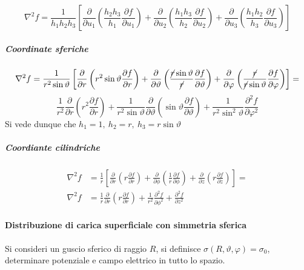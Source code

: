 $$
\nabla^2 f = \frac{1}{h_1h_2h_3} \left[ \frac{\partial}{\partial u_1}
\left(\frac{h_2h_3}{h_1}\frac{\partial f}{\partial u_1}\right) + 
\frac{\partial}{\partial u_2}
\left(\frac{h_1h_3}{h_2}\frac{\partial f}{\partial u_2}\right) + 
\frac{\partial}{\partial u_3}
\left(\frac{h_1h_2}{h_3}\frac{\partial f}{\partial u_3}\right)\right]
$$
\subparagraph{Coordinate sferiche}
$$
\nabla^2 f = \frac{1}{r^2\sin\vartheta} \left[\frac{\partial}{\partial r}\left(r^2\sin\vartheta\frac{\partial f}{\partial r}\right)+
\frac{\partial}{\partial \vartheta}\left( \frac{\cancel{r}\sin\vartheta}{\cancel{r}}\frac{\partial f}{\partial \vartheta}\right) +
\frac{\partial}{\partial \varphi}\left( \frac{\cancel{r}}{\cancel{r}\sin\vartheta}\frac{\partial f}{\partial \varphi}\right) \right] =
$$
$$
\frac{1}{r^2}\frac{\partial}{\partial r} \left(r^2 \frac{\partial f}{\partial r} \right) 
+ \frac{1}{r^2 \sin\vartheta}\frac{\partial}{\partial \vartheta} \left(\sin \vartheta \frac{\partial f}{\partial \vartheta}\right) +
\frac{1}{r^2\sin^2\vartheta} \frac{\partial^2 f}{\partial \varphi^2}
$$
Si vede dunque che $h_1=1,\ h_2=r,\ h_3 = r\sin\vartheta$
\subparagraph{Coordiante cilindriche}
$$
\begin{aligned}
\nabla^2 f &= \frac{1}{r} \left[\frac{\partial}{\partial r}\left(r\frac{\partial f}{\partial r} \right) + \frac{\partial}{\partial \phi}\left(\frac{1}{r}\frac{\partial f }{\partial \phi} \right) + \frac{\partial}{\partial z} \left(r \frac{\partial f}{\partial z}\right) \right] = \\
\nabla^2 f &= \frac{1}{r}\frac{\partial}{\partial r} \left(r\frac{\partial f }{\partial r}\right) + \frac{1}{r^2}\frac{\partial^2 f}{\partial \phi^2} + \frac{\partial^2 f}{\partial z^2}
\end{aligned}
$$

\paragraph{Distribuzione di carica superficiale con simmetria sferica}
Si consideri un guscio sferico di raggio $R$, si definisce 
$\sigma(R,\vartheta,\varphi) = \sigma_0$, determinare potenziale e campo elettrico in
tutto lo spazio.

